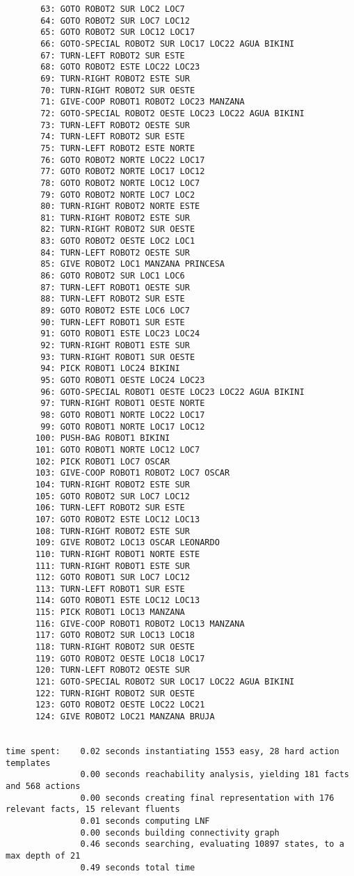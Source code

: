 \documentclass{article}
\begin{document}
\begin{lstlisting}
       63: GOTO ROBOT2 SUR LOC2 LOC7
       64: GOTO ROBOT2 SUR LOC7 LOC12
       65: GOTO ROBOT2 SUR LOC12 LOC17
       66: GOTO-SPECIAL ROBOT2 SUR LOC17 LOC22 AGUA BIKINI
       67: TURN-LEFT ROBOT2 SUR ESTE
       68: GOTO ROBOT2 ESTE LOC22 LOC23
       69: TURN-RIGHT ROBOT2 ESTE SUR
       70: TURN-RIGHT ROBOT2 SUR OESTE
       71: GIVE-COOP ROBOT1 ROBOT2 LOC23 MANZANA
       72: GOTO-SPECIAL ROBOT2 OESTE LOC23 LOC22 AGUA BIKINI
       73: TURN-LEFT ROBOT2 OESTE SUR
       74: TURN-LEFT ROBOT2 SUR ESTE
       75: TURN-LEFT ROBOT2 ESTE NORTE
       76: GOTO ROBOT2 NORTE LOC22 LOC17
       77: GOTO ROBOT2 NORTE LOC17 LOC12
       78: GOTO ROBOT2 NORTE LOC12 LOC7
       79: GOTO ROBOT2 NORTE LOC7 LOC2
       80: TURN-RIGHT ROBOT2 NORTE ESTE
       81: TURN-RIGHT ROBOT2 ESTE SUR
       82: TURN-RIGHT ROBOT2 SUR OESTE
       83: GOTO ROBOT2 OESTE LOC2 LOC1
       84: TURN-LEFT ROBOT2 OESTE SUR
       85: GIVE ROBOT2 LOC1 MANZANA PRINCESA
       86: GOTO ROBOT2 SUR LOC1 LOC6
       87: TURN-LEFT ROBOT1 OESTE SUR
       88: TURN-LEFT ROBOT2 SUR ESTE
       89: GOTO ROBOT2 ESTE LOC6 LOC7
       90: TURN-LEFT ROBOT1 SUR ESTE
       91: GOTO ROBOT1 ESTE LOC23 LOC24
       92: TURN-RIGHT ROBOT1 ESTE SUR
       93: TURN-RIGHT ROBOT1 SUR OESTE
       94: PICK ROBOT1 LOC24 BIKINI
       95: GOTO ROBOT1 OESTE LOC24 LOC23
       96: GOTO-SPECIAL ROBOT1 OESTE LOC23 LOC22 AGUA BIKINI
       97: TURN-RIGHT ROBOT1 OESTE NORTE
       98: GOTO ROBOT1 NORTE LOC22 LOC17
       99: GOTO ROBOT1 NORTE LOC17 LOC12
      100: PUSH-BAG ROBOT1 BIKINI
      101: GOTO ROBOT1 NORTE LOC12 LOC7
      102: PICK ROBOT1 LOC7 OSCAR
      103: GIVE-COOP ROBOT1 ROBOT2 LOC7 OSCAR
      104: TURN-RIGHT ROBOT2 ESTE SUR
      105: GOTO ROBOT2 SUR LOC7 LOC12
      106: TURN-LEFT ROBOT2 SUR ESTE
      107: GOTO ROBOT2 ESTE LOC12 LOC13
      108: TURN-RIGHT ROBOT2 ESTE SUR
      109: GIVE ROBOT2 LOC13 OSCAR LEONARDO
      110: TURN-RIGHT ROBOT1 NORTE ESTE
      111: TURN-RIGHT ROBOT1 ESTE SUR
      112: GOTO ROBOT1 SUR LOC7 LOC12
      113: TURN-LEFT ROBOT1 SUR ESTE
      114: GOTO ROBOT1 ESTE LOC12 LOC13
      115: PICK ROBOT1 LOC13 MANZANA
      116: GIVE-COOP ROBOT1 ROBOT2 LOC13 MANZANA
      117: GOTO ROBOT2 SUR LOC13 LOC18
      118: TURN-RIGHT ROBOT2 SUR OESTE
      119: GOTO ROBOT2 OESTE LOC18 LOC17
      120: TURN-LEFT ROBOT2 OESTE SUR
      121: GOTO-SPECIAL ROBOT2 SUR LOC17 LOC22 AGUA BIKINI
      122: TURN-RIGHT ROBOT2 SUR OESTE
      123: GOTO ROBOT2 OESTE LOC22 LOC21
      124: GIVE ROBOT2 LOC21 MANZANA BRUJA


time spent:    0.02 seconds instantiating 1553 easy, 28 hard action templates
               0.00 seconds reachability analysis, yielding 181 facts and 568 actions
               0.00 seconds creating final representation with 176 relevant facts, 15 relevant fluents
               0.01 seconds computing LNF
               0.00 seconds building connectivity graph
               0.46 seconds searching, evaluating 10897 states, to a max depth of 21
               0.49 seconds total time
\end{lstlisting}
\end{document}
